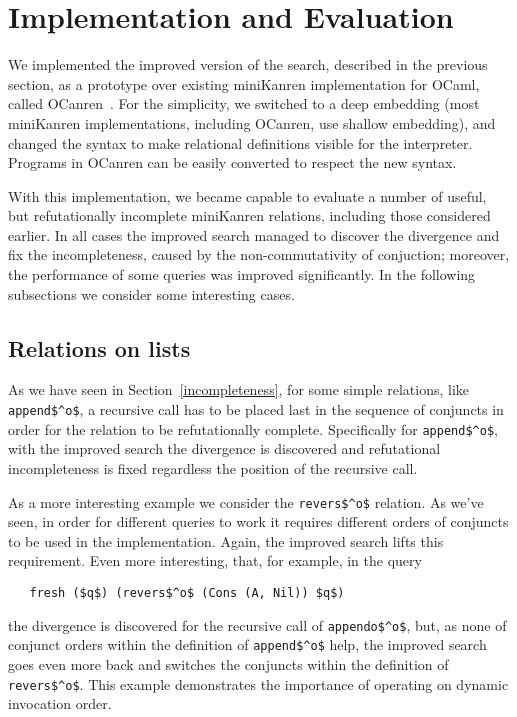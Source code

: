 \section{Implementation and Evaluation}
\label{evaluation}

We implemented the improved version of the search, described in the previous section, 
as a prototype over existing miniKanren implementation for OCaml, called OCanren~\cite{OCanren}. 
For the simplicity, we switched to a deep embedding (most miniKanren implementations, 
including OCanren, use shallow embedding), and changed the syntax to make relational definitions
visible for the interpreter. Programs in OCanren can be easily converted to respect 
the new syntax.

With this implementation, we became capable to evaluate a number of useful, but refutationally 
incomplete miniKanren relations, including those considered earlier. In all cases the 
improved search managed to discover the divergence and fix the incompleteness, caused by
the non-commutativity of conjuction; moreover, the performance of some queries was improved 
significantly. In the following subsections we consider some interesting cases.

\subsection{Relations on lists}

As we have seen in Section~\ref{incompleteness}, for some simple relations, like \lstinline|append$^o$|,
a recursive call has to be placed last in the sequence of conjuncts in order for the 
relation to be refutationally complete. Specifically for \lstinline|append$^o$|, with the improved search 
the divergence is discovered and refutational incompleteness is fixed regardless the position of 
the recursive call.

As a more interesting example we consider the \lstinline|revers$^o$| relation. As we've
seen, in order for different queries to work it requires different orders of conjuncts 
to be used in the implementation. Again, the improved search lifts this requirement.
Even more interesting, that, for example, in the query 

\begin{lstlisting}
   fresh ($q$) (revers$^o$ (Cons (A, Nil)) $q$)
\end{lstlisting}

\noindent the divergence is discovered for the recursive call of \lstinline|appendo$^o$|, but,
as none of conjunct orders within the definition of \lstinline|append$^o$| help, the
improved search goes even more back and switches the conjuncts within the definition of
\lstinline|revers$^o$|. This example demonstrates the importance of operating on 
dynamic invocation order.

